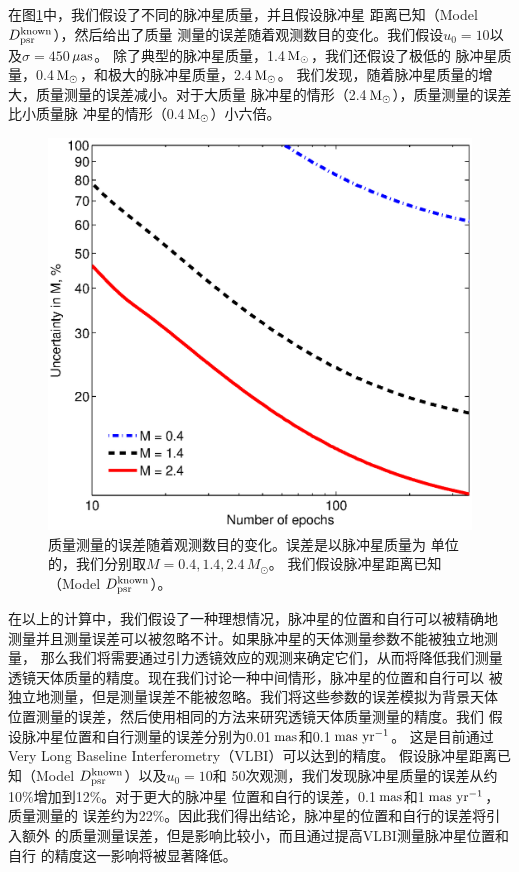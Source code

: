 %
在图\ref{masses}中，我们假设了不同的脉冲星质量，并且假设脉冲星
距离已知（Model $D_{\rm{psr}}^{\rm{known}}$），然后给出了质量
测量的误差随着观测数目的变化。我们假设$u_0=10$以及$\sigma=450$\,$\rm{\mu as}$。
除了典型的脉冲星质量，1.4\,$\rm{M_{\odot}}$，我们还假设了极低的
脉冲星质量，0.4\,$\rm{M_{\odot}}$，和极大的脉冲星质量，2.4\,$\rm{M_{\odot}}$。
我们发现，随着脉冲星质量的增大，质量测量的误差减小。对于大质量
脉冲星的情形（2.4\,$\rm{M_{\odot}}$），质量测量的误差比小质量脉
冲星的情形（0.4\,$\rm{M_{\odot}}$）小六倍。
%
\begin{figure}
\begin{center}
  \includegraphics[width=3.5 in,trim=0 0 0 3.2cm]{masses.eps}
%
\caption{质量测量的误差随着观测数目的变化。误差是以脉冲星质量为
单位的，我们分别取$M=0.4,1.4,2.4$\,$M_{\odot}$。
我们假设脉冲星距离已知（Model $D_{\rm{psr}}^{\rm{known}}$）。
}
\label{masses}
\end{center}
\end{figure}
%

在以上的计算中，我们假设了一种理想情况，脉冲星的位置和自行可以被精确地
测量并且测量误差可以被忽略不计。如果脉冲星的天体测量参数不能被独立地测量，
那么我们将需要通过引力透镜效应的观测来确定它们，从而将降低我们测量
透镜天体质量的精度。现在我们讨论一种中间情形，脉冲星的位置和自行可以
被独立地测量，但是测量误差不能被忽略。我们将这些参数的误差模拟为背景天体
位置测量的误差，然后使用相同的方法来研究透镜天体质量测量的精度。我们
假设脉冲星位置和自行测量的误差分别为0.01\,$\rm{mas}$和0.1\,$\rm{mas\ yr^{-1}}$。
这是目前通过Very Long Baseline Interferometry（VLBI）可以达到的精度\supercite{deller}。
假设脉冲星距离已知（Model $D_{\rm{psr}}^{\rm{known}}$）以及$u_0=10$和
50次观测，我们发现脉冲星质量的误差从约10\%增加到12\%。对于更大的脉冲星
位置和自行的误差，0.1\,$\rm{mas}$和1\,$\rm{mas\ yr^{-1}}$，质量测量的
误差约为22\%。因此我们得出结论，脉冲星的位置和自行的误差将引入额外
的质量测量误差，但是影响比较小，而且通过提高VLBI测量脉冲星位置和自行
的精度这一影响将被显著降低。

